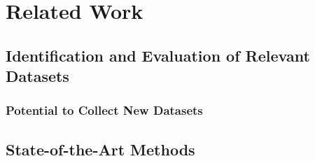 \section{Related Work}

\subsection{Identification and Evaluation of Relevant Datasets}






\subsubsection{Potential to Collect New Datasets}


\subsection{State-of-the-Art Methods}

